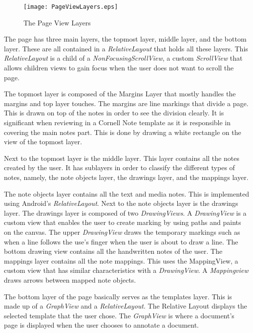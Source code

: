 \begin{figure}[htbp!]           
   \centering          
   \texttt{[image: PageViewLayers.eps]} 
   \caption{The Page View Layers}
   \label{fig:pageviewlayers}
\end{figure}

The page has three main layers, the topmost layer, middle layer, and the bottom layer. These are all contained in a \textit{RelativeLayout} that holds all these layers. This \textit{RelativeLayout} is a child of a \textit{NonFocusingScrollView}, a custom \textit{ScrollView} that allows children views to gain focus when the user does not want to scroll the page.

The topmost layer is composed of the Margins Layer that mostly handles the margins and top layer touches. The margins are line markings that divide a page. This is drawn on top of the notes in order to see the division clearly. It is significant when reviewing in a Cornell Note template as it is responsible in covering the main notes part. This is done by drawing a white rectangle on the view of the topmost layer. 

Next to the topmost layer is the middle layer. This layer contains all the notes created by the user. It has sublayers in order to classify the different types of notes, namely, the note objects layer, the drawings layer, and the mappings layer. 

The note objects layer contains all the text and media notes. This is implemented using Android's \textit{RelativeLayout}. Next to the note objects layer is the drawings layer. The drawings layer is composed of two \textit{DrawingViews}. A \textit{DrawingView} is a custom view that enables the user to create marking by using paths and paints on the canvas. The upper \textit{DrawingView} draws the temporary markings such as when a line follows the use's finger when the user is about to draw a line. The bottom drawing view contains all the handwritten notes of the user. The mappings layer contains all the note mappings. This uses the MappingView, a custom view that has similar characteristics with a \textit{DrawingView}. A \textit{Mappingview} draws arrows between mapped note objects.

The bottom layer of the page basically serves as the templates layer. This is made up of a \textit{GraphView} and a \textit{RelativeLayout}. The Relative Layout displays the selected template that the user chose. The \textit{GraphView} is where a document's page is displayed when the user chooses to annotate a document.

